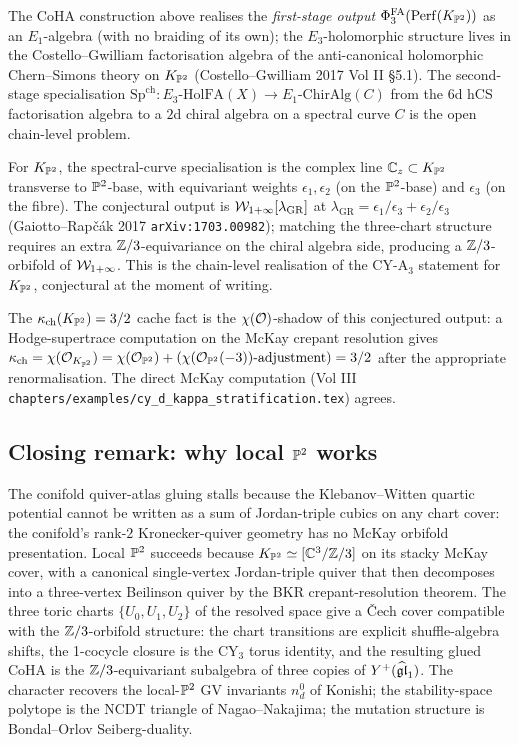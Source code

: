 \begin{remark}
\label{rmk:local-P2-phi3}
The CoHA construction above realises the \emph{first-stage output}
$\Phi_3^\mathrm{FA}(\mathrm{Perf}(K_{\mathbb{P}^2}))$ as an $E_1$-algebra (with no
braiding of its own); the $E_3$-holomorphic structure lives in the
Costello--Gwilliam factorisation algebra of the anti-canonical
holomorphic Chern--Simons theory on $K_{\mathbb{P}^2}$ (Costello--Gwilliam 2017
Vol II §5.1). The second-stage specialisation
$\mathrm{Sp}^{\mathrm{ch}}:E_3\text{-HolFA}(X)\to E_1\text{-ChirAlg}(C)$
from the $6$d hCS factorisation algebra to a $2$d chiral algebra on a
spectral curve $C$ is the open chain-level problem.

For $K_{\mathbb{P}^2}$, the spectral-curve specialisation is the complex line
$\mathbb{C}_z\subset K_{\mathbb{P}^2}$ transverse to $\mathbb{P}^2$-base, with equivariant
weights $\epsilon_1,\epsilon_2$ (on the $\mathbb{P}^2$-base) and $\epsilon_3$
(on the fibre). The conjectural output is $\mathcal{W}_{1+\infty}[\lambda_{\mathrm{GR}}]$
at $\lambda_{\mathrm{GR}}=\epsilon_1/\epsilon_3+\epsilon_2/\epsilon_3$
(Gaiotto--Rap\v c\'ak 2017 \texttt{arXiv:1703.00982}); matching the
three-chart structure requires an extra $\mathbb{Z}/3$-equivariance on the
chiral algebra side, producing a $\mathbb{Z}/3$-orbifold of $\mathcal{W}_{1+\infty}$. This is
the chain-level realisation of the CY-A$_3$ statement for
$K_{\mathbb{P}^2}$, conjectural at the moment of writing.

The $\kappa_{\mathrm{ch}}(K_{\mathbb{P}^2})=3/2$ cache fact is the $\chi(\mathcal{O})$-shadow
of this conjectured output: a Hodge-supertrace computation on the
McKay crepant resolution gives $\kappa_{\mathrm{ch}}=\chi(\mathcal{O}_{K_{\mathbb{P}^2}})
=\chi(\mathcal{O}_{\mathbb{P}^2})+(\chi(\mathcal{O}_{\mathbb{P}^2}(-3))\text{-adjustment})=3/2$ after
the appropriate renormalisation. The direct McKay computation (Vol III
\texttt{chapters/examples/cy\_d\_kappa\_stratification.tex}) agrees.
\end{remark}

\subsection*{Closing remark: why local $\mathbb{P}^2$ works}

The conifold quiver-atlas gluing stalls because the Klebanov--Witten
quartic potential cannot be written as a sum of Jordan-triple cubics on
any chart cover: the conifold's rank-$2$ Kronecker-quiver geometry has
no McKay orbifold presentation. Local $\mathbb{P}^2$ succeeds because
$K_{\mathbb{P}^2}\simeq[\mathbb{C}^3/\mathbb{Z}/3]$ on its stacky McKay cover, with a
canonical single-vertex Jordan-triple quiver that then decomposes into
a three-vertex Beilinson quiver by the BKR crepant-resolution theorem.
The three toric charts $\{U_0,U_1,U_2\}$ of the resolved space give a
\v Cech cover compatible with the $\mathbb{Z}/3$-orbifold structure: the chart
transitions are explicit shuffle-algebra shifts, the 1-cocycle closure
is the CY$_3$ torus identity, and the resulting glued CoHA is the
$\mathbb{Z}/3$-equivariant subalgebra of three copies of
$Y^+(\widehat{\mathfrak{gl}}_1)$. The character recovers the local-$\mathbb{P}^2$ GV invariants
$n_d^0$ of Konishi; the stability-space polytope is the NCDT triangle
of Nagao--Nakajima; the mutation structure is Bondal--Orlov
Seiberg-duality.

